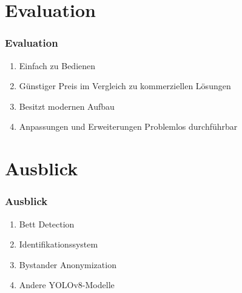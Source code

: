 \documentclass[]{beamer}
\begin{document}
\section{Evaluation}
\begin{frame}
	\frametitle{Evaluation}
	\begin{enumerate}
		\item Einfach zu Bedienen
		\item Günstiger Preis im Vergleich zu kommerziellen Lösungen
		\item Besitzt modernen Aufbau
		\item Anpassungen und Erweiterungen Problemlos durchführbar
	\end{enumerate}
\end{frame}

\section{Ausblick}
\begin{frame}
	\frametitle{Ausblick}
	\begin{enumerate}
		\item Bett Detection
		\item Identifikationssystem
		\item Bystander Anonymization
		\item Andere YOLOv8-Modelle 
	\end{enumerate}
\end{frame}
\end{document}
